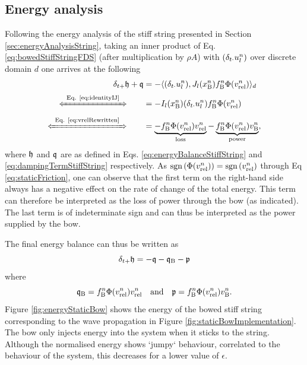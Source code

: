 \subsection{Energy analysis}
Following the energy analysis of the stiff string presented in Section \ref{sec:energyAnalysisString}, taking an inner product of Eq. \eqref{eq:bowedStiffStringFDS} (after multiplication by $\rho A$) with $(\delta_{t\cdot} u_l^n)$ over discrete domain $d$ one arrives at the following 
\begin{align*}
    \dtp \h + \q &=  - \langle (\dtd \uln), J_l(x_\Btxt^n)f_\Btxt^n\Phi(\vrel^n) \rangle_d\\[-5pt]
    \xLeftrightarrow{\mystrut\ \text{Eq. \eqref{eq:identityIJ}}\ }\qquad &= -I_l(x_\Btxt^n)(\dtd \uln) f_\Btxt^n \Phi(\vrel^n) \\[-5pt]
    \xLeftrightarrow{\mystrut\ \text{Eq. \eqref{eq:vrelRewritten}}\ } \qquad &= \underbrace{-f_\Btxt^n \Phi(\vrel^n) \vrel^n}_{\text{loss}} - \underbrace{f_\Btxt^n \Phi(\vrel^n)v_\Btxt^n}_{\text{power}},
\end{align*}
where $\mathfrak{h}$ and $\mathfrak{q}$ are as defined in Eqs. \eqref{eq:energyBalanceStiffString} and \eqref{eq:dampingTermStiffString} respectively. As $\text{sgn}\left(\Phi(v_\text{rel}^n)\right) = \text{sgn}\left(v_\text{rel}^n\right)$ through Eq \eqref{eq:staticFriction}, one can observe that the first term on the right-hand side always has a negative effect on the rate of change of the total energy. This term can therefore be interpreted as the loss of power through the bow (as indicated). The last term is of indeterminate sign and can thus be interpreted as the power supplied by the bow. 

The final energy balance can thus be written as
\begin{equation}\label{eq:energyBalanceBow}
    \delta_{t+} \mathfrak{h} = -\mathfrak{q} - \mathfrak{q}_\text{B} - \mathfrak{p} 
\end{equation}
where 
\begin{equation*}
    \mathfrak{q}_\text{B} = f_{\text{B}}^n \Phi(v_\text{rel}^n) v_\text{rel}^n \quad \text{and} \quad \mathfrak{p} = f_{\text{B}}^n \Phi(v_\text{rel}^n)v_{\text{B}}^n.
\end{equation*}
Figure \ref{fig:energyStaticBow} shows the energy of the bowed stiff string corresponding to the wave propagation in Figure \ref{fig:staticBowImplementation}. The bow only injects energy into the system when it sticks to the string. Although the normalised energy shows `jumpy` behaviour, correlated to the behaviour of the system, this decreases for a lower value of $\epsilon$. 

